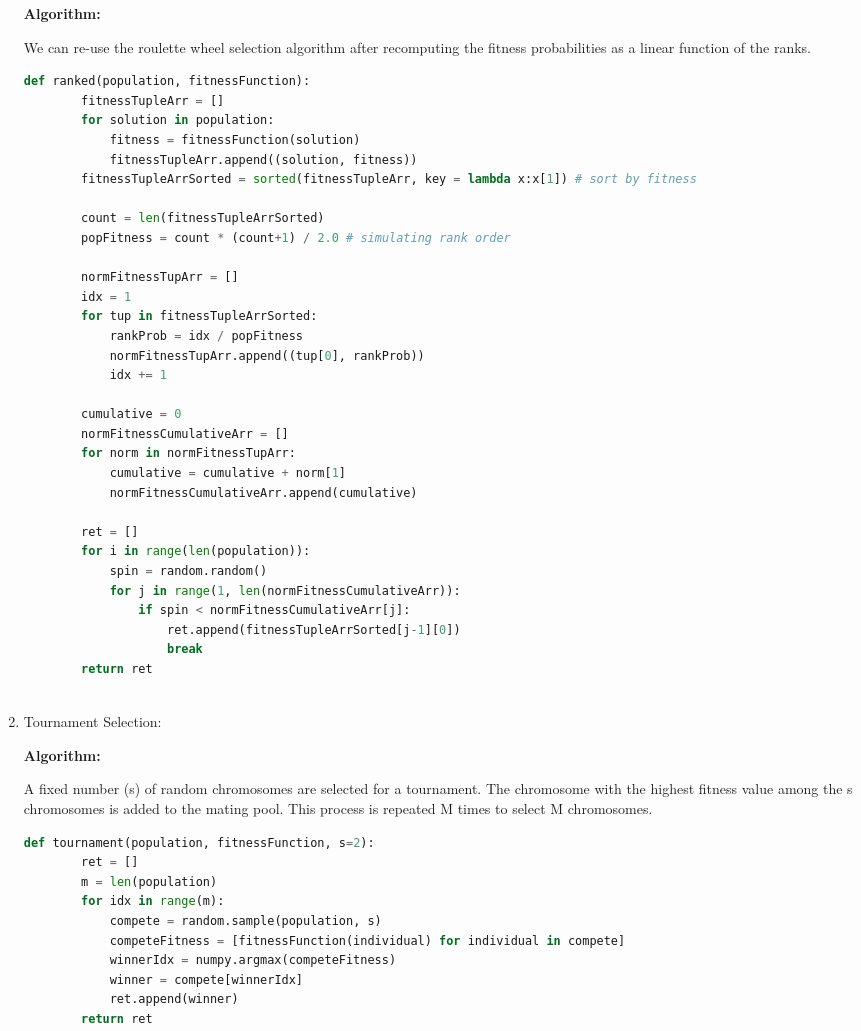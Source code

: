 \documentclass[12pt,a4paper]{article}
\begin{document}
\begin{enumerate}
	\textbf{Algorithm:} \par
	We can re-use the roulette wheel selection algorithm after recomputing the fitness probabilities as a linear function of the ranks.
	\vspace{5mm}
	\begin{lstlisting}[language=Python]
    def ranked(population, fitnessFunction):
        fitnessTupleArr = []
        for solution in population:
            fitness = fitnessFunction(solution)
            fitnessTupleArr.append((solution, fitness))
        fitnessTupleArrSorted = sorted(fitnessTupleArr, key = lambda x:x[1]) # sort by fitness
    
        count = len(fitnessTupleArrSorted)
        popFitness = count * (count+1) / 2.0 # simulating rank order
    
        normFitnessTupArr = []
        idx = 1
        for tup in fitnessTupleArrSorted:
            rankProb = idx / popFitness
            normFitnessTupArr.append((tup[0], rankProb))
            idx += 1
    
        cumulative = 0
        normFitnessCumulativeArr = []
        for norm in normFitnessTupArr:
            cumulative = cumulative + norm[1]
            normFitnessCumulativeArr.append(cumulative)
    
        ret = []
        for i in range(len(population)):
            spin = random.random()
            for j in range(1, len(normFitnessCumulativeArr)):
                if spin < normFitnessCumulativeArr[j]:
                    ret.append(fitnessTupleArrSorted[j-1][0])
                    break
        return ret
	        
	\end{lstlisting}

	\item Tournament Selection: \par
	\textbf{Algorithm:} \par
	A fixed number (s) of random chromosomes are selected for a tournament. The chromosome with the highest fitness value among the s chromosomes is added to the mating pool. This process is repeated M times to select M chromosomes.
	\begin{lstlisting}[language=Python]
    def tournament(population, fitnessFunction, s=2):
        ret = []
        m = len(population)
        for idx in range(m):
            compete = random.sample(population, s)
            competeFitness = [fitnessFunction(individual) for individual in compete]
            winnerIdx = numpy.argmax(competeFitness)
            winner = compete[winnerIdx]
            ret.append(winner)
        return ret
	\end{lstlisting}

	\end{enumerate}
\end{document}
